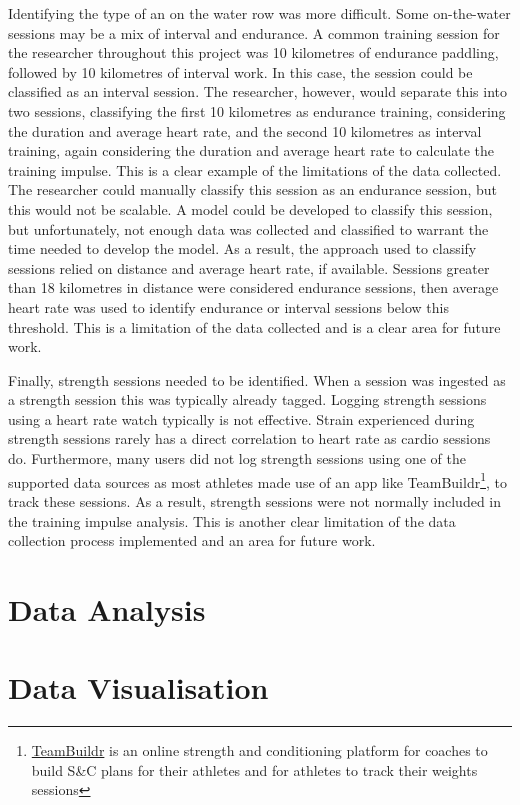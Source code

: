 Identifying the type of an on the water row was more difficult. Some on-the-water sessions may be a mix of interval and endurance. A common training session for the researcher throughout this project was 10 kilometres of endurance paddling, followed by 10 kilometres of interval work. In this case, the session could be classified as an interval session. The researcher, however, would separate this into two sessions, classifying the first 10 kilometres as endurance training, considering the duration and average heart rate, and the second 10 kilometres as interval training, again considering the duration and average heart rate to calculate the training impulse. This is a clear example of the limitations of the data collected. The researcher could manually classify this session as an endurance session, but this would not be scalable. A model could be developed to classify this session, but unfortunately, not enough data was collected and classified to warrant the time needed to develop the model. As a result, the approach used to classify sessions relied on distance and average heart rate, if available. Sessions greater than 18 kilometres in distance were considered endurance sessions, then average heart rate was used to identify endurance or interval sessions below this threshold. This is a limitation of the data collected and is a clear area for future work.

Finally, strength sessions needed to be identified. When a session was ingested as a strength session this was typically already tagged. Logging strength sessions using a heart rate watch typically is not effective. Strain experienced during strength sessions rarely has a direct correlation to heart rate as cardio sessions do. Furthermore, many users did not log strength sessions using one of the supported data sources as most athletes made use of an app like TeamBuildr\footnote{\href{https://www.teambuildr.com/}{TeamBuildr} is an online strength and conditioning platform for coaches to build S\&C plans for their athletes and for athletes to track their weights sessions}, to track these sessions. As a result, strength sessions were not normally included in the training impulse analysis.  This is another clear limitation of the data collection process implemented and an area for future work. 

\section{Data Analysis}

\section{Data Visualisation}